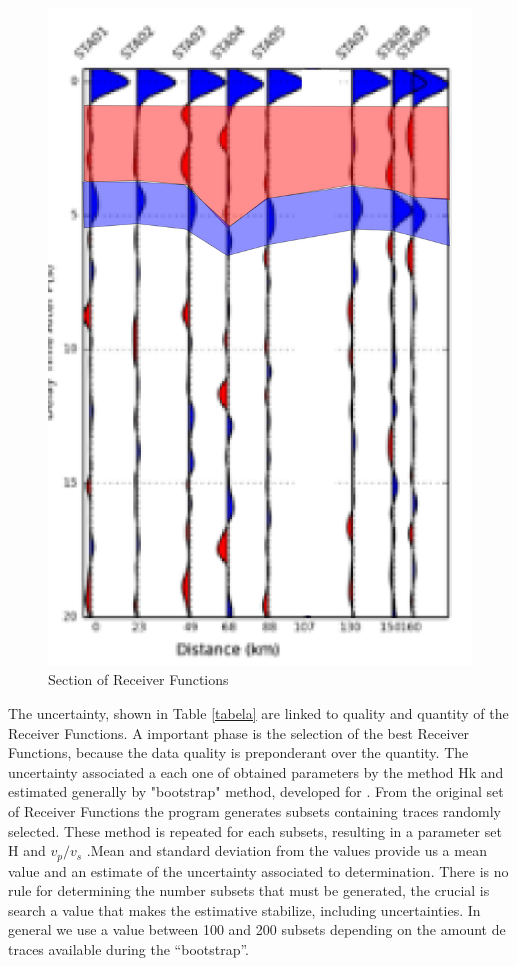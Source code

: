 \documentclass[twoside,letterpaper,twocolumn]{article}
\begin{document}
\begin{figure}[!ht]
\centering
\includegraphics[scale=0.15]{empilhamento_FR_NW.png} \caption{Section of Receiver Functions} 
\label{figura6}
\end{figure}

The uncertainty, shown in Table \ref{tabela} are linked to quality and quantity of the Receiver Functions. A important phase is the selection of the best Receiver Functions, because the data quality is preponderant over the quantity. The uncertainty associated a each one of obtained parameters by the method Hk and estimated generally by "bootstrap" method, developed for  \citep{efron_statistical_1991}. From the original set of Receiver Functions the program generates subsets containing traces randomly selected. These method is repeated for each subsets, resulting in a parameter set H and $v_{p}/v_{s}$ .Mean and standard deviation from the values provide us a mean value and an estimate of the uncertainty associated to determination. There is no rule for determining the number subsets that must be generated, the crucial is search a value that makes the estimative stabilize,  including uncertainties. In general we use a value between 100 and 200 subsets depending on the amount de traces available during the “bootstrap”.
\end{document}
